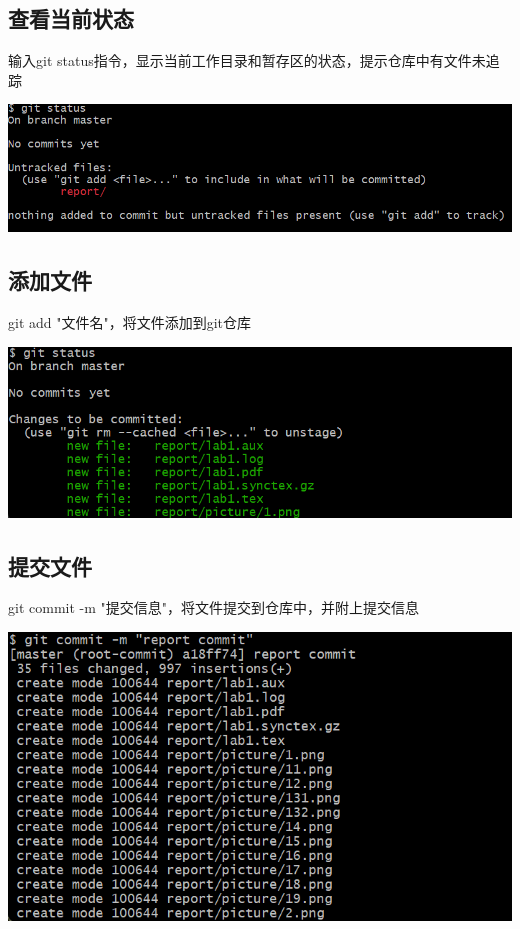 \documentclass[UTF8,a4paper]{ctexart}
\begin{document}
\begin{sloppypar}
	\subsection{查看当前状态}
	输入git status指令，显示当前工作目录和暂存区的状态，提示仓库中有文件未追踪
	
	\includegraphics[width = 16cm]{2}
	
	\subsection{添加文件}
	git add "文件名"，将文件添加到git仓库
	
	\includegraphics[width = 16cm]{3}
	
	\subsection{提交文件}
	git commit -m "提交信息"，将文件提交到仓库中，并附上提交信息
	
	\includegraphics[width = 16cm]{4}
	

\end{sloppypar}
\end{document}
